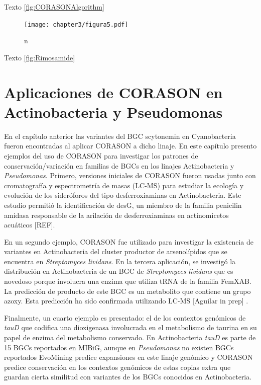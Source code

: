\documentclass[12pt,twoside]{reedthesis}
\begin{document}
  Texto \autoref{fig:CORASONAlgorithm}
  
  \begin{figure}[h!tbp]
  \centering
  \texttt{[image: chapter3/figura5.pdf]}
  \caption[EvoMining Algorithm]{\footnotesize{n}}
  \label{fig:Rimosamide}
  \end{figure}
  
  Texto \autoref{fig:Rimosamide}
  
  \section{Aplicaciones de CORASON en Actinobacteria y
  Pseudomonas}\label{aplicaciones-de-corason-en-actinobacteria-y-pseudomonas}
  
  En el capítulo anterior las variantes del BGC scytonemin en
  Cyanobacteria fueron encontradas al aplicar CORASON a dicho linaje. En
  este capítulo presento ejemplos del uso de CORASON para investigar los
  patrones de conservación/variación en familias de BGCs en los linajes
  Actinobacteria y \emph{Pseudomonas}. Primero, versiones iniciales de
  CORASON fueron usadas junto con cromatografía y espectrometría de masas
  (LC-MS) para estudiar la ecología y evolución de los sideróforos del
  tipo desferroxiaminas en Actinobacteria. Este estudio permitió la
  identificación de desG, un miembro de la familia penicilin amidasa
  responsable de la arilación de desferroxiaminas en actinomicetos
  acuáticos {[}REF{]}.
  
  En un segundo ejemplo, CORASON fue utilizado para investigar la
  existencia de variantes en Actinobacteria del cluster productor de
  arsenolípidos que se encuentra en \emph{Streptomyces lividans}. En la
  tercera aplicación, se investigó la distribución en Actinobacteria de un
  BGC de \emph{Streptomyces lividans} que es novedoso porque involucra una
  enzima que utiliza tRNA de la familia FemXAB. La predicción de producto
  de este BGC es un metabolito que contiene un grupo azoxy. Esta
  predicción ha sido confirmada utilizando LC-MS {[}Aguilar in prep{]} .
  
  Finalmente, un cuarto ejemplo es presentado: el de los contextos
  genómicos de \emph{tauD} que codifica una dioxigenasa involucrada en el
  metabolismo de taurina en su papel de enzima del metabolismo conservado.
  En Actinobacteria \emph{tauD} es parte de 15 BGCs reportados en MIBiG,
  aunque en \emph{Pseudomonas} no existen BGCs reportados EvoMining
  predice expansiones en este linaje genómico y CORASON predice
  conservación en los contextos genómicos de estas copias extra que
  guardan cierta similitud con variantes de los BGCs conocidos en
  Actinobacteria.
  
\end{document}
